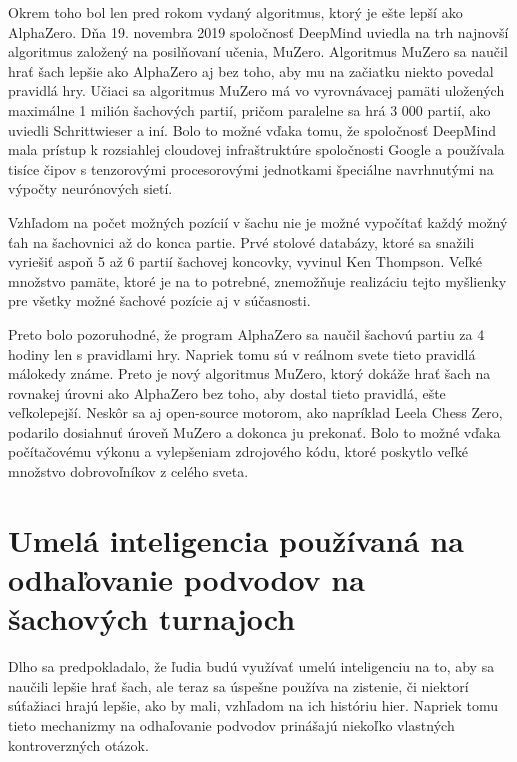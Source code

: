\documentclass[10pt,oneside,slovak,a4paper]{article}
\begin{document}
Okrem toho bol len pred rokom vydaný algoritmus, ktorý je ešte lepší ako AlphaZero. Dňa 19. novembra 2019 spoločnosť DeepMind uviedla na trh najnovší algoritmus založený na posilňovaní učenia, MuZero. Algoritmus MuZero sa naučil hrať šach lepšie ako AlphaZero aj bez toho, aby mu na začiatku niekto povedal pravidlá hry. Učiaci sa algoritmus MuZero má vo vyrovnávacej pamäti uložených maximálne 1 milión šachových partií, pričom paralelne sa hrá 3 000 partií, ako uviedli Schrittwieser a iní. Bolo to možné vďaka tomu, že spoločnosť DeepMind mala prístup k rozsiahlej cloudovej infraštruktúre spoločnosti Google a používala tisíce čipov s tenzorovými procesorovými jednotkami špeciálne navrhnutými na výpočty neurónových sietí.

Vzhľadom na počet možných pozícií v šachu nie je možné vypočítať každý možný ťah na šachovnici až do konca partie. Prvé stolové databázy, ktoré sa snažili vyriešiť aspoň 5 až 6 partií šachovej koncovky, vyvinul Ken Thompson. Veľké množstvo pamäte, ktoré je na to potrebné, znemožňuje realizáciu tejto myšlienky pre všetky možné šachové pozície aj v súčasnosti.

Preto bolo pozoruhodné, že program AlphaZero sa naučil šachovú partiu za 4 hodiny len s pravidlami hry. Napriek tomu sú v reálnom svete tieto pravidlá málokedy známe. Preto je nový algoritmus MuZero, ktorý dokáže hrať šach na rovnakej úrovni ako AlphaZero bez toho, aby dostal tieto pravidlá, ešte veľkolepejší. Neskôr sa aj open-source motorom, ako napríklad Leela Chess Zero, podarilo dosiahnuť úroveň MuZero a dokonca ju prekonať. Bolo to možné vďaka počítačovému výkonu a vylepšeniam zdrojového kódu, ktoré poskytlo veľké množstvo dobrovoľníkov z celého sveta.






\section{Umelá inteligencia používaná na odhaľovanie podvodov na šachových turnajoch}

Dlho sa predpokladalo, že ľudia budú využívať umelú inteligenciu na to, aby sa naučili lepšie hrať šach, ale teraz sa úspešne používa na zistenie, či niektorí súťažiaci hrajú lepšie, ako by mali, vzhľadom na ich históriu hier. Napriek tomu tieto mechanizmy na odhaľovanie podvodov prinášajú niekoľko vlastných kontroverzných otázok.
\end{document}
